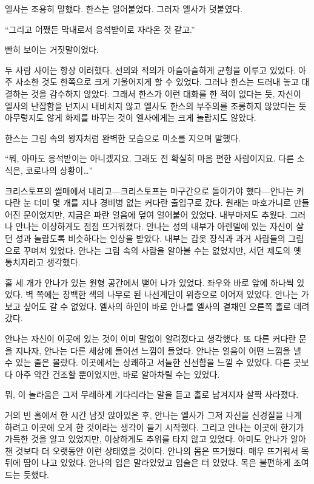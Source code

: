 엘사는 조용히 말했다. 한스는 얼어붙었다. 그러자 엘사가 덧붙였다.

``그리고 어쨌든 막내로서 응석받이로 자라온 것 같고.''

빤히 보이는 거짓말이었다.

두 사람 사이는 항상 이러했다. 선의와 적의가 아슬아슬하게 균형을 이루고 있었다. 아주 사소한 것도 한쪽으로 크게 기울어지게 할 수 있었다. 그러나 한스는 드러내 놓고 대결하는 것을 감수하지 않았다. 그래서 한스가 이런 대화를 한 적이 없다는 듯, 자신이 엘사의 난잡함을 넌지시 내비치지 않고 엘사도 한스의 부주의를 조롱하지 않았다는 듯 아무렇지도 않게 화제를 바꾸는 것이 엘사에게는 크게 놀랍지도 않았다. 

한스는 그림 속의 왕자처럼 완벽한 모습으로 미소를 지으며 말했다.

``뭐, 아마도 응석받이는 아니겠지요. 그래도 전 확실히 마음 편한 사람이지요. 다른 소식은, 코로나의 상황이\ldots''

\textbreak

크리스토프의 썰매에서 내리고—크리스토프는 마구간으로 돌아가야 했다—안나는 커다란 눈 더미 몇 개를 지나 경비병 없는 커다란 출입구로 갔다. 원래는 마호가니로 만들어진 문이었지만, 지금은 파란 얼음에 덮여 얼어붙어 있었다. 내부마저도 추웠다. 그러나 안나는 이상하게도 점점 뜨거워졌다. 안나는 성의 내부가 아렌델에 있는 자신이 살던 성과 놀랍도록 비슷하다는 인상을 받았다. 내부는 갑옷 장식과 과거 사람들의 그림으로 꾸며져 있었다. 안나는 그림 속의 사람을 알아볼 수는 없었지만, 서던 제도의 옛 통치자라고 생각했다.

홀 세 개가 안나가 있는 원형 공간에서 뻗어 나가 있었다. 좌우와 바로 앞에 하나씩 있었다. 벽 쪽에는 창백한 색의 나무로 된 나선계단이 위층으로 이어져 있었다. 안나는 가 보고 싶어도 갈 수 없었다. 엘사의 하인이 바로 안나를 엘사의 곁채인 오른쪽 홀로 데려갔다.

안나는 자신이 이곳에 있는 것이 이미 말없이 알려졌다고 생각했다. 또 다른 커다란 문을 지나자, 안나는 다른 세상에 들어선 느낌이 들었다. 안나는 얼음이 어떤 느낌을 낼 수 있는 줄은 몰랐다. 이곳에서는 상쾌하고 서늘한 신선함을 느낄 수 있었다. 다른 곳보다 아주 약간 건조할 뿐이었지만, 바로 알아차릴 수는 있었다.

뭐, 이 놀라움은 그저 무례하게 기다리라는 말을 듣고 홀로 남겨지자 살짝 사라졌다.

거의 빈 홀에서 한 시간 남짓 앉아있은 후, 안나는 엘사가 그저 자신을 신경질을 나게 하려고 이곳에 오게 한 것이라는 생각이 들기 시작했다. 그리고 안나는 이곳에 한기가 가득한 것을 알고 있었지만, 이상하게도 추위를 타지 않고 있었다. 아미도 안나가 알아챈 것보다 더 오랫동안 이런 상태였을 것이다. 안나의 몸은 뜨거웠다. 매우 뜨거워서 목 뒤에 땀이 나고 있었다. 안나의 입은 말라있었고 입술은 터 있었다. 목은 불편하게 조여드는 듯했다.


